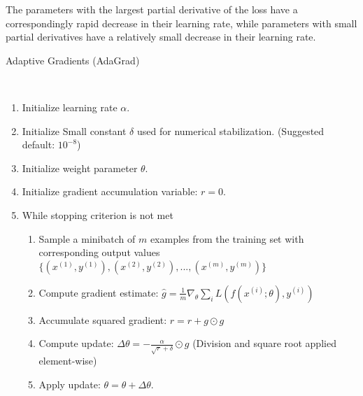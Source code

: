 The parameters with the largest partial derivative of the loss have a
correspondingly rapid decrease in their learning rate, while parameters with small
partial derivatives have a relatively small decrease in their learning rate.




\begin{algorithm}
	\caption{Adaptive Gradients (AdaGrad)  \cite{goodfellow2016deep}}\label{alg:adaGrad}
	\begin{algorithmic}
		\\
		\begin{enumerate}
			\item Initialize learning rate $\alpha$.		
			\item Initialize Small constant $\delta$ used for numerical stabilization. (Suggested default: $10^{-8}$)
			\item Initialize weight parameter $\theta$.
			\item Initialize gradient accumulation variable: $r = 0$.
			\item While stopping criterion is not met
			\begin{enumerate}[label=\emph{\alph*})]
				\item Sample a minibatch of $m$ examples from the training set with corresponding output values
				$\{(x^{(1)}, y^{(1)}), (x^{(2)}, y^{(2)}), ..., (x^{(m)}, y^{(m)})\}$
				\item Compute gradient estimate: $\hat{g} = \frac{1}{m} \nabla_\theta \sum_i L(f(x^{(i)};\theta), y^{(i)})$
				\item Accumulate squared gradient: $r = r + g \odot g$
				\item Compute update: $\Delta \theta = - \frac{\alpha}{\sqrt{r} + \delta} \odot g$ (Division and square root applied element-wise)
				\item Apply update: $\theta = \theta + \Delta \theta$.
			\end{enumerate}
		\end{enumerate}
	\end{algorithmic}
\end{algorithm}




